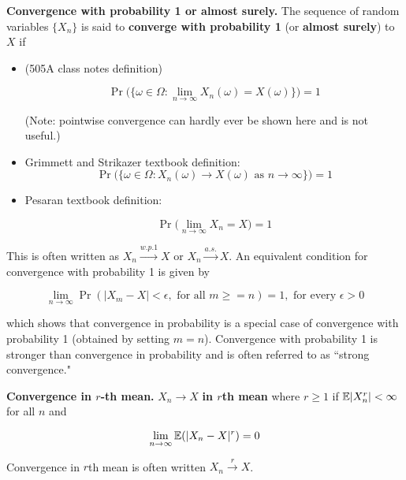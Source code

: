 \begin{definition}
\textbf{Convergence with probability 1 or almost surely.} The sequence of random variables \(\{X_n\}\) is said to \textbf{converge with probability 1} (or \textbf{almost surely}) to \(X\) if 

\begin{itemize}

\item (505A class notes definition)

\[
\Pr\big( \{\omega \in \Omega: \lim_{n \to \infty} X_n(\omega) = X(\omega) \} \big) = 1
\]

(Note: pointwise convergence can hardly ever be shown here and is not useful.)

\item Grimmett and Strikazer textbook definition:
\[
\Pr \big( \{\omega \in \Omega: X_n(\omega) \to X(\omega) \text{ as } n \to \infty \} \big) = 1
\]

\item Pesaran textbook definition:

\[
\Pr \bigg( \lim_{n \to \infty} X_n = X \bigg) = 1
\]

\end{itemize}

This is often written as \(X_n \xrightarrow{w.p.1} X\) or \(X_n \xrightarrow{a.s.} X\). An equivalent condition for convergence with probability 1 is given by

\[
\lim_{n \to \infty} \Pr( |X_m - X| < \epsilon, \text{ for all } m \geq =n) = 1, \text{ for every } \epsilon > 0
\]

which shows that convergence in probability is a special case of convergence with probability 1 (obtained by setting \(m = n\)). Convergence with probability 1 is stronger than convergence in probability and is often referred to as ``strong convergence." 

\end{definition}

\begin{definition}
\textbf{Convergence in \(r\)-th mean.} \(X_n \to X\) \textbf{in \(r\)th mean} where \(r \geq 1\) if \(\mathbb{E}|X_n^r| < \infty\) for all \(n\) and

\[
\lim_{n \to \infty} \mathbb{E}(|X_n - X|^r) = 0
\]

Convergence in \(r\)th mean is often written \(X_n \xrightarrow{r} X\).
\end{definition}

